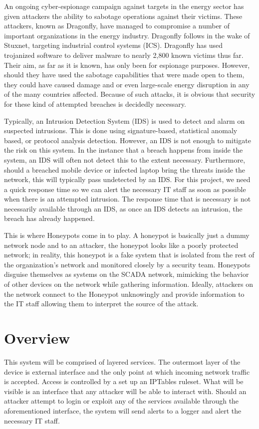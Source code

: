 An ongoing cyber-espionage campaign against targets in the energy sector has given attackers the ability to sabotage operations against their victims. These attackers, known as Dragonfly, have managed to compromise a number of important organizations in the energy industry. Dragonfly follows in the wake of Stuxnet, targeting industrial control systems (ICS). Dragonfly has used trojanized software to deliver malware to nearly 2,800 known victims thus far. Their aim, as far as it is known, has only been for espionage purposes. However, should they have used the sabotage capabilities that were made open to them, they could have caused damage and or even large-scale energy disruption in any of the many countries affected. Because of such attacks, it is obvious that security for these kind of attempted breaches is decidedly necessary. 

Typically, an Intrusion Detection System (IDS) is used to detect and alarm on suspected intrusions. This is done using signature-based, statistical anomaly based, or protocol analysis detection. However, an IDS is not enough to mitigate the risk on this system. In the instance that a breach happens from inside the system, an IDS will often not detect this to the extent necessary. Furthermore, should a breached mobile device or infected laptop bring the threats inside the network, this will typically pass undetected by an IDS. For this project, we need a quick response time so we can alert the necessary IT staff as soon as possible when there is an attempted intrusion. The response time that is necessary is not necessarily available through an IDS, as once an IDS detects an intrusion, the breach has already happened.

This is where Honeypots come in to play. A honeypot is basically just a dummy network node and to an attacker, the honeypot looks like a poorly protected network; in reality, this honeypot is a fake system that is isolated from the rest of the organization’s network and monitored closely by a security team. Honeypots disguise themselves as systems on the SCADA network, mimicking the behavior of other devices on the network while gathering information. Ideally, attackers on the network connect to the Honeypot unknowingly and provide information to the IT staff allowing them to interpret the source of the attack.

\section{Overview}
This system will be comprised of layered services. The outermost layer of the device is external interface and the only point at which incoming network traffic is accepted. Access is controlled by a set up an IPTables ruleset. What will be visible is an interface that any attacker will be able to interact with. Should an attacker attempt to login or exploit any of the services available through the aforementioned interface, the system will send alerts to a logger and alert the necessary IT staff.

